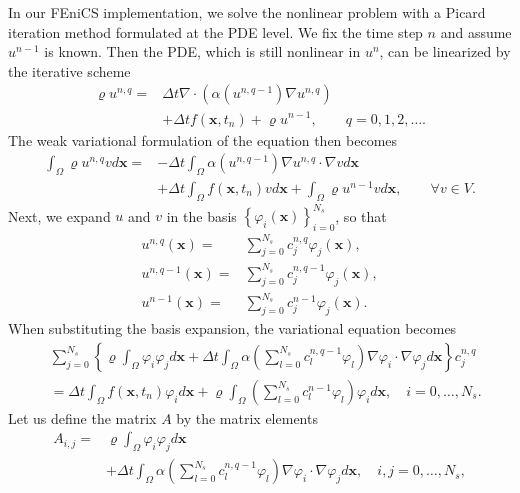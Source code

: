 \documentclass[twoside]{article}
\begin{document}
In our FEniCS implementation, we solve the nonlinear problem with a Picard iteration method formulated at the PDE level. We fix the time step $n$ and assume $u^{n-1}$ is known. Then the PDE, which is still nonlinear in $u^{n}$, can be linearized by the iterative scheme
\begin{align}
  \varrho u^{n, q} =& \Delta t \nabla \cdot \left( \alpha(u^{n, q-1})\nabla u^{n, q}\right) \nonumber \\
& + \Delta t f(\mathbf{x}, t_{n}) + \varrho u^{n-1}, \qquad q = 0, 1, 2, \dots .
\end{align}
The weak variational formulation of the equation then becomes 
\begin{align}
  \int_{\Omega }\varrho u^{n, q}v d\mathbf{x} =& -\Delta t \int_{\Omega }\alpha(u^{n, q-1})\nabla u^{n, q}\cdot \nabla v d\mathbf{x} \nonumber \\
  & + \Delta t \int_{\Omega }f(\mathbf{x}, t_{n})v d\mathbf{x} + \int_{\Omega }\varrho u^{n-1}v d\mathbf{x}, \qquad \forall v \in V.
\end{align}
Next, we expand $u$ and $v$ in the basis $\left\{ \varphi_{i}(\mathbf{x}) \right\}_{i=0}^{N_{s}}$, so that
\begin{align}
  u^{n, q}(\mathbf{x}) =& \sum_{j=0}^{N_{s}}c_{j}^{n, q}\varphi_{j}(\mathbf{x}), \nonumber \\
  u^{n, q-1}(\mathbf{x}) =& \sum_{j=0}^{N_{s}}c_{j}^{n, q-1}\varphi_{j}(\mathbf{x}), \nonumber \\
  u^{n-1}(\mathbf{x}) =& \sum_{j=0}^{N_{s}}c_{j}^{n-1}\varphi_{j}(\mathbf{x}).
\end{align}
When substituting the basis expansion, the variational equation becomes
\begin{align}
  & \sum_{j=0}^{N_{s}} \left\{ \varrho \int_{\Omega }\varphi_{i}\varphi_{j}d\mathbf{x} + \Delta t \int_{\Omega }\alpha\left( \sum_{l=0}^{N_{s}}c_{l}^{n, q-1}\varphi_{l}\right)\nabla \varphi_{i} \cdot \nabla \varphi_{j}d\mathbf{x} \right\}c_{j}^{n, q} \nonumber \\
  & = \Delta t \int_{\Omega }f(\mathbf{x}, t_{n})\varphi_{i}d\mathbf{x} + \varrho \int_{\Omega } \left( \sum_{l=0}^{N_{s}}c_{l}^{n-1}\varphi_{l} \right)\varphi_{i}d\mathbf{x} , \quad i = 0, \dots , N_{s}.
\end{align}
Let us define the matrix $A$ by the matrix elements
\begin{align}
  A_{i, j} =& \varrho \int_{\Omega }\varphi_{i}\varphi_{j}d\mathbf{x} \nonumber \\
  & + \Delta t \int_{\Omega }\alpha\left( \sum_{l=0}^{N_{s}}c_{l}^{n, q-1}\varphi_{l}\right)\nabla \varphi_{i}\cdot \nabla \varphi_{j}d\mathbf{x}, \quad i, j = 0, \dots , N_{s}, 
\end{align}
\end{document}
